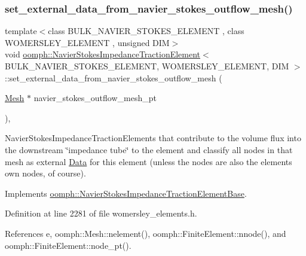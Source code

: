 \subsubsection{\texorpdfstring{set\+\_\+external\+\_\+data\+\_\+from\+\_\+navier\+\_\+stokes\+\_\+outflow\+\_\+mesh()}{set\_external\_data\_from\_navier\_stokes\_outflow\_mesh()}}
{\footnotesize\ttfamily template$<$class B\+U\+L\+K\+\_\+\+N\+A\+V\+I\+E\+R\+\_\+\+S\+T\+O\+K\+E\+S\+\_\+\+E\+L\+E\+M\+E\+NT , class W\+O\+M\+E\+R\+S\+L\+E\+Y\+\_\+\+E\+L\+E\+M\+E\+NT , unsigned D\+IM$>$ \\
void \hyperlink{classoomph_1_1NavierStokesImpedanceTractionElement}{oomph\+::\+Navier\+Stokes\+Impedance\+Traction\+Element}$<$ B\+U\+L\+K\+\_\+\+N\+A\+V\+I\+E\+R\+\_\+\+S\+T\+O\+K\+E\+S\+\_\+\+E\+L\+E\+M\+E\+NT, W\+O\+M\+E\+R\+S\+L\+E\+Y\+\_\+\+E\+L\+E\+M\+E\+NT, D\+IM $>$\+::set\+\_\+external\+\_\+data\+\_\+from\+\_\+navier\+\_\+stokes\+\_\+outflow\+\_\+mesh (\begin{DoxyParamCaption}\item[{\hyperlink{classoomph_1_1Mesh}{Mesh} $\ast$}]{navier\+\_\+stokes\+\_\+outflow\+\_\+mesh\+\_\+pt }\end{DoxyParamCaption})\hspace{0.3cm}{\ttfamily [inline]}, {\ttfamily [virtual]}}



Navier\+Stokes\+Impedance\+Traction\+Elements that contribute to the volume flux into the downstream \char`\"{}impedance tube\char`\"{} to the element and classify all nodes in that mesh as external \hyperlink{classoomph_1_1Data}{Data} for this element (unless the nodes are also the element\textquotesingle{}s own nodes, of course). 



Implements \hyperlink{classoomph_1_1NavierStokesImpedanceTractionElementBase_a648cfcbd9bf1f3404b0e7f184cecdc62}{oomph\+::\+Navier\+Stokes\+Impedance\+Traction\+Element\+Base}.



Definition at line 2281 of file womersley\+\_\+elements.\+h.



References e, oomph\+::\+Mesh\+::nelement(), oomph\+::\+Finite\+Element\+::nnode(), and oomph\+::\+Finite\+Element\+::node\+\_\+pt().

\mbox{\label{classoomph_1_1NavierStokesImpedanceTractionElement_aab0f649a0569d9caa428b8a932cc1c40}} 
